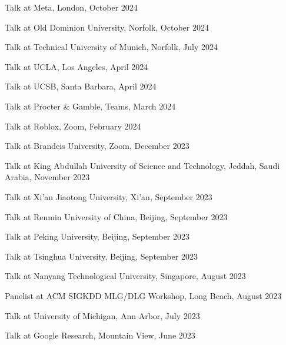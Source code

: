 \documentclass[10pt]{article}
\newenvironment{myindentpar}[1]%
{\begin{list}{}%
         {\setlength{\leftmargin}{#1}}%
         \item[]%
}
{\end{list}}
\newcounter{list}
\begin{document}
\begin{myindentpar}{0.75cm}

\hspace{-0.75cm} Talk at Meta, London, October 2024
	
\hspace{-0.75cm} Talk at Old Dominion University, Norfolk, October 2024
	
\hspace{-0.75cm} Talk at Technical University of Munich, Norfolk, July 2024
	
\hspace{-0.75cm} Talk at UCLA, Los Angeles, April 2024
	
\hspace{-0.75cm} Talk at UCSB, Santa Barbara, April 2024

\hspace{-0.75cm} Talk at Procter \& Gamble, Teams, March 2024
	
\hspace{-0.75cm} Talk at Roblox, Zoom, February 2024
	
\hspace{-0.75cm} Talk at Brandeis University, Zoom, December 2023	

\hspace{-0.75cm} Talk at King Abdullah University of Science and Technology, Jeddah, Saudi Arabia, November 2023	

\hspace{-0.75cm} Talk at Xi'an Jiaotong University, Xi'an, September 2023

\hspace{-0.75cm} Talk at Renmin University of China, Beijing, September 2023	
	
\hspace{-0.75cm} Talk at Peking University, Beijing, September 2023	

\hspace{-0.75cm} Talk at Tsinghua University, Beijing, September 2023
	
\hspace{-0.75cm} Talk at Nanyang Technological University, Singapore, August 2023	
	
\hspace{-0.75cm} Panelist at ACM SIGKDD MLG/DLG Workshop, Long Beach, August 2023

\hspace{-0.75cm} Talk at University of Michigan, Ann Arbor, July 2023	

\hspace{-0.75cm} Talk at Google Research, Mountain View, June 2023
	

\end{myindentpar}
\end{document}
